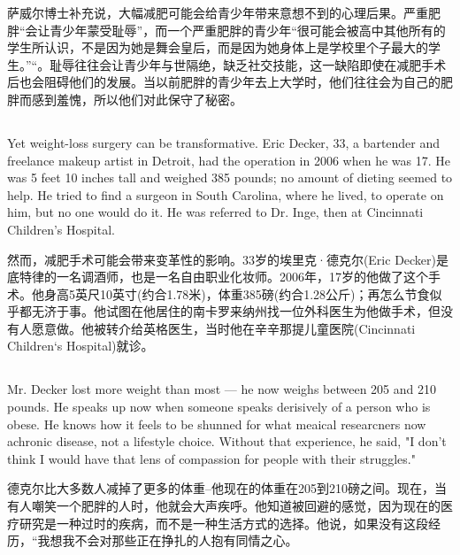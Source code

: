 \documentclass[]{article}
\begin{document}
萨威尔博士补充说，大幅减肥可能会给青少年带来意想不到的心理后果。严重肥胖“会让青少年蒙受耻辱”，而一个严重肥胖的青少年“很可能会被高中其他所有的学生所认识，不是因为她是舞会皇后，而是因为她身体上是学校里个子最大的学生。”“。耻辱往往会让青少年与世隔绝，缺乏社交技能，这一缺陷即使在减肥手术后也会阻碍他们的发展。当以前肥胖的青少年去上大学时，他们往往会为自己的肥胖而感到羞愧，所以他们对此保守了秘密。

\subsection{}
\begin{spacing}{2.0}
	{\Large Yet weight-loss surgery can be transformative. Eric	Decker, 33, a bartender	and freelance makeup artist in Detroit, had the operation in 2006 when he was 17. He was 5 feet 10 inches tall and weighed 385 pounds; no amount of dieting seemed to help. He tried to find a surgeon in South Carolina, where he lived, to operate on him, but no one would do it. He was referred to Dr. Inge, then at Cincinnati Children's Hospital.}\newline
\end{spacing}

然而，减肥手术可能会带来变革性的影响。33岁的埃里克·德克尔(Eric Decker)是底特律的一名调酒师，也是一名自由职业化妆师。2006年，17岁的他做了这个手术。他身高5英尺10英寸(约合1.78米)，体重385磅(约合1.28公斤)；再怎么节食似乎都无济于事。他试图在他居住的南卡罗来纳州找一位外科医生为他做手术，但没有人愿意做。他被转介给英格医生，当时他在辛辛那提儿童医院(Cincinnati Children‘s Hospital)就诊。

\subsection{}
\begin{spacing}{2.0}
	{\Large Mr. Decker lost more weight than most — he now weighs between 205 and 210 pounds. He speaks up now when someone speaks derisively of a person who is
	obese. He knows how it feels to be shunned for what meaical researcners now achronic disease, not a lifestyle choice. Without that experience, he said, "I don't think I would have that lens of compassion for people with their struggles."}\newline
\end{spacing}

德克尔比大多数人减掉了更多的体重--他现在的体重在205到210磅之间。现在，当有人嘲笑一个肥胖的人时，他就会大声疾呼。他知道被回避的感觉，因为现在的医疗研究是一种过时的疾病，而不是一种生活方式的选择。他说，如果没有这段经历，“我想我不会对那些正在挣扎的人抱有同情之心。
\end{document}
